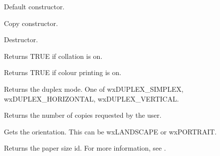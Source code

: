 


Default constructor.


Copy constructor.



Destructor.

\label{wxprintdatagetcollate}


Returns TRUE if collation is on.

\label{wxprintdatagetcolour}


Returns TRUE if colour printing is on.

\label{wxprintdatagetduplex}


Returns the duplex mode. One of wxDUPLEX\_SIMPLEX, wxDUPLEX\_HORIZONTAL, wxDUPLEX\_VERTICAL.

\label{wxprintdatagetnocopies}


Returns the number of copies requested by the user.

\label{wxprintdatagetorientation}


Gets the orientation. This can be wxLANDSCAPE or wxPORTRAIT.

\label{wxprintdatagetpaperid}


Returns the paper size id. For more information, see .

\label{wxprintdatagetprintername}


